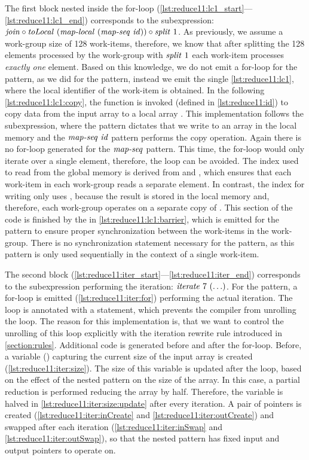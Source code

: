 The first block nested inside the for-loop (\autoref{lst:reduce11:lc1_start}---\autoref{lst:reduce11:lc1_end}) corresponds to the subexpression:
$\text{\textit{join}} \circ \text{\textit{toLocal}}\ (\text{\textit{map-local}}\ (\text{\textit{map-seq}}\ \text{\textit{id}})) \circ \text{\textit{split}}\ 1$.
As previously, we assume a work-group size of 128 work-items, therefore, we know that after splitting the 128 elements processed by the work-group with $\text{\textit{split}}\ 1$ each work-item processes \emph{exactly one} element.
Based on this knowledge, we do not emit a for-loop for the \mapLocal pattern, as we did for the \mapWorkgroup pattern, instead we emit the single \autoref{lst:reduce11:lc1}, where the local identifier of the work-item is obtained.
In the following \autoref{lst:reduce11:lc1:copy}, the  function is invoked (defined in \autoref{lst:reduce11:id}) to copy data from the input array to a local array .
This implementation follows the subexpression, where the \toLocal pattern dictates that we write to an array in the local memory and the $\text{\textit{map-seq}}\ \text{\textit{id}}$ pattern performs the copy operation.
Again there is no for-loop generated for the $\text{\textit{map-seq}}$ pattern.
This time, the for-loop would only iterate over a single element, therefore, the loop can be avoided.
The index used to read from the global memory is derived from  and , which ensures that each work-item in each work-group reads a separate element.
In contrast, the index for writing only uses , because the result is stored in the local memory and, therefore, each work-group operates on a separate copy of .
This section of the code is finished by the  in \autoref{lst:reduce11:lc1:barrier}, which is emitted for the \mapLocal pattern to ensure proper synchronization between the work-items in the work-group.
There is no synchronization statement necessary for the \mapSeq pattern, as this pattern is only used sequentially in the context of a single work-item.

The second block (\autoref{lst:reduce11:iter_start}---\autoref{lst:reduce11:iter_end}) corresponds to the subexpression performing the iteration:
$\text{\textit{iterate}}\ 7\ (\ldots)$.
For the \iterateN pattern, a for-loop is emitted (\autoref{lst:reduce11:iter:for}) performing the actual iteration.
The loop is annotated with a  statement, which prevents the \OpenCL compiler from unrolling the loop.
The reason for this implementation is, that we want to control the unrolling of this loop explicitly with the iteration rewrite rule introduced in \autoref{section:rules}.
Additional code is generated before and after the for-loop.
Before, a variable () capturing the current size of the input array is created (\autoref{lst:reduce11:iter:size}).
The size of this variable is updated after the loop, based on the effect of the nested pattern on the size of the array.
In this case, a partial reduction is performed reducing the array by half.
Therefore, the  variable is halved in \autoref{lst:reduce11:iter:size:update} after every iteration.
A pair of pointers is created (\autoref{lst:reduce11:iter:inCreate} and \autoref{lst:reduce11:iter:outCreate}) and swapped after each iteration (\autoref{lst:reduce11:iter:inSwap} and \autoref{lst:reduce11:iter:outSwap}), so that the nested pattern has fixed input and output pointers to operate on.

